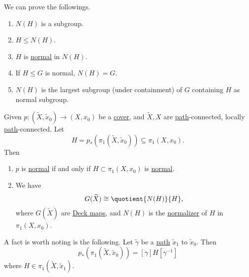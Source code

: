 \begin{exercise}
	We can prove the followings.
	\begin{enumerate}
		\item \(N(H)\) is a subgroup.
		\item \(H\leq N(H)\).
		\item \(H\) is \underline{normal} in \(N(H)\).
		\item If \(H\leq G\) is normal, \(N(H) = G\).
		\item \(N(H)\) is the largest subgroup (under containment) of \(G\) containing \(H\) as normal subgroup.
	\end{enumerate}
\end{exercise}

\begin{proposition}\label{prop:lec17}
	Given \(p\colon (\widetilde{X} , \widetilde{x} _0)\to (X, x_0)\) be a \hyperref[def:covering-map]{cover}, and \(\widetilde{X} , X\)
	are \hyperref[def:path]{path}-connected, locally \hyperref[def:path]{path}-connected. Let
	\[
		H = p_\ast \left(\pi _1(\widetilde{X} , \widetilde{x} _0)\right)\subseteq \pi _1(X, x_0).
	\]
	Then
	\begin{enumerate}
		\item \(p\) is \hyperref[def:normal]{normal} if and only if \(H\subset \pi _1(X, x_0)\) is \hyperref[def:normal]{normal}.
		\item We have
		      \[
			      G(\widetilde{X} )\cong \quotient{N(H)}{H},
		      \]
		      where \(G(\widetilde{X} )\) are \hyperref[def:deck-transformation]{Deck maps}, and \(N(H)\) is the \hyperref[def:normalizer]{normalizer}
		      of \(H\) in \(\pi _1(X, x_0)\).
	\end{enumerate}
\end{proposition}

\begin{remark}
	A fact is worth noting is the following. Let \(\widetilde{\gamma} \) be a \hyperref[def:path]{path} \(\widetilde{x} _1\) to \(\widetilde{x} _0\).
	Then
	\[
		p_\ast \left(\pi _1(\widetilde{X} , \widetilde{x} _0)\right)= [\gamma ] H [\gamma ^{-1}]
	\]
	where \(H\in \pi _1(\widetilde{X} , \widetilde{x} _1)\).
	\begin{figure}[H]
		\centering
		\label{fig:rmk:lec17:1}
	\end{figure}
\end{remark}